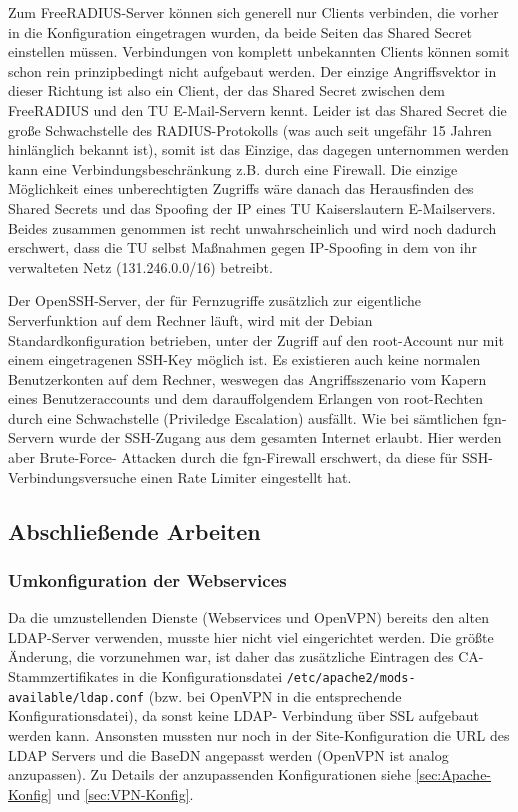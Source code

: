 \documentclass[11pt,a4paper,titlepage=firstiscover,headsepline,bibtotoc]{scrartcl} %
\newcommand{\hilight}[1]{\colorbox{yellow}{#1}} %
\begin{document}
Zum FreeRADIUS-Server können sich generell nur Clients verbinden, die vorher in die Konfiguration eingetragen wurden, da beide Seiten das Shared Secret einstellen müssen. Verbindungen von komplett unbekannten Clients können somit schon rein prinzipbedingt nicht aufgebaut werden. Der einzige Angriffsvektor in dieser Richtung ist also ein Client, der das Shared Secret zwischen dem FreeRADIUS und den TU E-Mail-Servern kennt. Leider ist das Shared Secret die große Schwachstelle des RADIUS-Protokolls (was auch seit ungefähr 15 Jahren hinlänglich bekannt ist), somit ist das Einzige, das dagegen unternommen werden kann eine Verbindungsbeschränkung z.B. durch eine Firewall. Die einzige Möglichkeit eines unberechtigten Zugriffs wäre danach das Herausfinden des Shared Secrets und das Spoofing der IP eines TU Kaiserslautern E-Mailservers. Beides zusammen genommen ist recht unwahrscheinlich und wird noch dadurch erschwert, dass die TU selbst Maßnahmen gegen IP-Spoofing in dem von ihr verwalteten Netz (131.246.0.0/16) betreibt.

Der OpenSSH-Server, der für Fernzugriffe zusätzlich zur eigentliche Serverfunktion auf dem Rechner läuft, wird mit der Debian Standardkonfiguration betrieben, unter der Zugriff auf den root-Account nur mit einem eingetragenen SSH-Key möglich ist. Es existieren auch keine normalen Benutzerkonten auf dem Rechner, weswegen das Angriffsszenario vom Kapern eines Benutzeraccounts und dem darauffolgendem Erlangen von root-Rechten durch eine Schwachstelle (Priviledge Escalation) ausfällt. Wie bei sämtlichen fgn-Servern wurde der SSH-Zugang aus dem gesamten Internet erlaubt. Hier werden aber Brute-Force- Attacken durch die fgn-Firewall erschwert, da diese für SSH-Verbindungsversuche einen Rate Limiter eingestellt hat.


\subsection{Abschließende Arbeiten}
\subsubsection{Umkonfiguration der Webservices}
Da die umzustellenden Dienste (Webservices und OpenVPN) bereits den alten LDAP-Server verwenden, musste hier nicht viel eingerichtet werden. Die größte Änderung, die vorzunehmen war, ist daher das zusätzliche Eintragen des CA-Stammzertifikates in die Konfigurationsdatei \texttt{/etc/apache2/mods-available/ldap.conf} (bzw. bei OpenVPN in die entsprechende Konfigurationsdatei), da sonst keine LDAP- Verbindung über SSL aufgebaut werden kann. Ansonsten mussten nur noch in der Site-Konfiguration die URL des LDAP Servers und die BaseDN angepasst werden (OpenVPN ist analog anzupassen). Zu Details der anzupassenden Konfigurationen siehe \autoref{sec:Apache-Konfig} und \autoref{sec:VPN-Konfig}.
\end{document}

